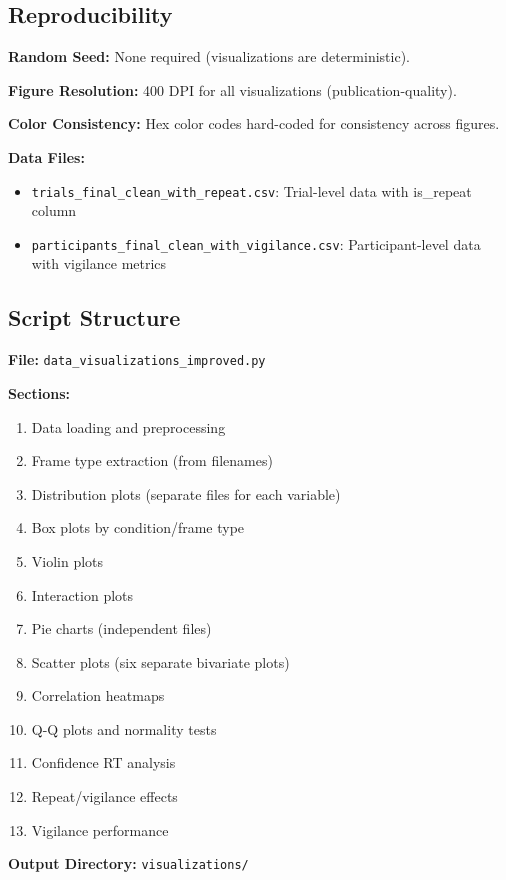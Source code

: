 \documentclass[12pt,a4paper]{article}
\begin{document}
\subsection{Reproducibility}

\textbf{Random Seed:} None required (visualizations are deterministic).

\textbf{Figure Resolution:} 400 DPI for all visualizations (publication-quality).

\textbf{Color Consistency:} Hex color codes hard-coded for consistency across figures.

\textbf{Data Files:}
\begin{itemize}
    \item \texttt{trials\_final\_clean\_with\_repeat.csv}: Trial-level data with is\_repeat column
    \item \texttt{participants\_final\_clean\_with\_vigilance.csv}: Participant-level data with vigilance metrics
\end{itemize}

\subsection{Script Structure}

\textbf{File:} \texttt{data\_visualizations\_improved.py}

\textbf{Sections:}
\begin{enumerate}
    \item Data loading and preprocessing
    \item Frame type extraction (from filenames)
    \item Distribution plots (separate files for each variable)
    \item Box plots by condition/frame type
    \item Violin plots
    \item Interaction plots
    \item Pie charts (independent files)
    \item Scatter plots (six separate bivariate plots)
    \item Correlation heatmaps
    \item Q-Q plots and normality tests
    \item Confidence RT analysis
    \item Repeat/vigilance effects
    \item Vigilance performance
\end{enumerate}

\textbf{Output Directory:} \texttt{visualizations/}
\end{document}
